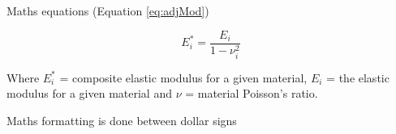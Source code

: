 Maths equations (Equation \ref{eq:adjMod})


\begin{equation}
	\label{eq:adjMod}
	E_{i}^{*} = \frac{E_{i}}{1-\nu_{i}^{2}}
\end{equation}

Where $E_{i}^{*}$ = composite elastic modulus for a given material, $E_{i}$ = the elastic modulus for a given material and $\nu$ = material Poisson's ratio.

Maths formatting is done between dollar signs